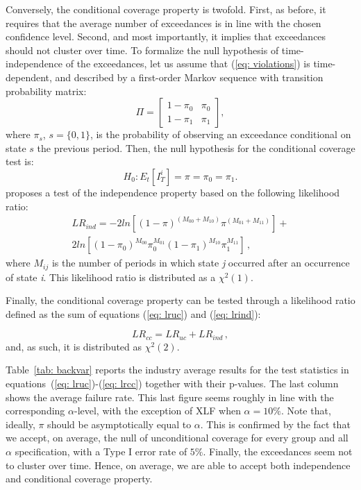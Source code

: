 \documentclass[11pt,a4paper,english]{article}
\begin{document}
Conversely, the conditional coverage property is twofold. First, as before, it requires that the average number of exceedances is in line with the chosen confidence level. Second, and most importantly, it implies that exceedances should not cluster over time. To formalize the null hypothesis of time-independence of the exceedances, let us assume that (\ref{eq: violations}) is time-dependent, and described by a first-order Markov sequence with transition probability matrix:
\begin{equation}
\label{eq: transmat}
\Pi=\begin{bmatrix}
1-\pi_{0} & \pi_0 \\
1-\pi_1 & \pi_1
\end{bmatrix},
\end{equation}
where $\pi_s$, $s=\{0,1\}$, is the probability of observing an exceedance conditional on state $s$ the previous period. Then, the null hypothesis for the conditional coverage test is:
\begin{equation}
\label{eq: chris null}
H_0: E_t[I_T^i]=\pi=\pi_{0}=\pi_{1}.
\end{equation}
\citet{Christoffersen1998} proposes a test of the independence property based on the following likelihood ratio:
\begin{multline}
\label{eq: lrind}
LR_{ind} = -2ln[(1-\pi)^{(M_{00}+M_{10})}\pi^{(M_{01}+M_{11})}] +\\
2ln[(1-\pi_0)^{M_{00}}\pi_0^{M_{01}}(1-\pi_1)^{M_{10}}\pi_1^{M_{11}}] \, ,
\end{multline}
where $M_{ij}$ is the number of periods in which state \textit{j} occurred after an occurrence of state \textit{i}. This likelihood ratio is distributed as a $\chi^2(1)$. 

Finally, the conditional coverage property can be tested through a likelihood ratio defined as the sum of equations (\ref{eq: lruc}) and (\ref{eq: lrind}): 

\begin{equation}
\label{eq: lrcc}
LR_{cc}=LR_{uc}+LR_{ind} \, ,
\end{equation}
and, as such, it is distributed as $\chi^2(2)$.

Table~\ref{tab: backvar} reports the industry average results for the test statistics in equations~(\ref{eq: lruc})-(\ref{eq: lrcc}) together with their p-values. The last column shows the average failure rate. This last figure seems roughly in line with the corresponding $\alpha$-level, with the exception of XLF when $\alpha=10\%$. Note that, ideally, $\pi$ should be asymptotically equal to $\alpha$. This is confirmed by the fact that we accept, on average, the null of unconditional coverage for every group and all $\alpha$ specification, with a Type I error rate of $5\%$. Finally, the exceedances seem not to cluster over time. Hence, on average, we are able to accept both independence and conditional coverage property. 
\end{document}
